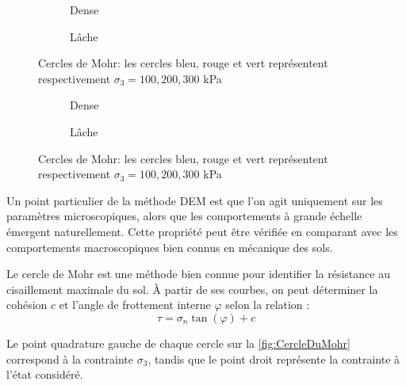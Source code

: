 \documentclass[a4paper,12pt]{report}
\begin{document}
\begin{figure}[h!]
    \centering
    \begin{subfigure}[b]{0.48\textwidth}
        \centering
        \scalebox{0.6}{}
        \caption{Dense}
        \label{fig:cercle_dense}
    \end{subfigure}
    \hfill
    \begin{subfigure}[b]{0.48\textwidth}
        \centering
        \scalebox{0.65}{}
        \caption{Lâche}
        \label{fig:cercle_lache}
    \end{subfigure}
    \caption{Cercles de Mohr: les cercles bleu, rouge et vert représentent respectivement $\sigma_3 = 100, 200, 300$ kPa}
    \label{fig:CercleDuMohr}
\end{figure}

\begin{figure}[h!]
    \centering
    \begin{subfigure}[b]{0.48\textwidth}
        \centering
        \scalebox{0.6}{}
        \caption{Dense}
        \label{fig:cercle_dense}
    \end{subfigure}
    \hfill
    \begin{subfigure}[b]{0.48\textwidth}
        \centering
        \scalebox{0.65}{}
        \caption{Lâche}
        \label{fig:cercle_lache}
    \end{subfigure}
    \caption{Cercles de Mohr: les cercles bleu, rouge et vert représentent respectivement $\sigma_3 = 100, 200, 300$ kPa}
    \label{fig:CercleDuMohr}
\end{figure}

Un point particulier de la méthode DEM est que l’on agit uniquement sur les paramètres microscopiques, alors que les comportements à grande échelle émergent naturellement.  
Cette propriété peut être vérifiée en comparant avec les comportements macroscopiques bien connus en mécanique des sols.  

Le cercle de Mohr est une méthode bien connue pour identifier la résistance au cisaillement maximale du sol.  
À partir de ses courbes, on peut déterminer la cohésion $c$ et l’angle de frottement interne $\varphi$ selon la relation :
\begin{equation}
    \tau = \sigma_n \tan(\varphi) + c
    \label{eq:tangentMohr}
\end{equation}

Le point quadrature gauche de chaque cercle sur la \autoref{fig:CercleDuMohr} correspond à la contrainte $\sigma_3$, tandis que le point droit représente la contrainte à l’état considéré.  
\end{document}
